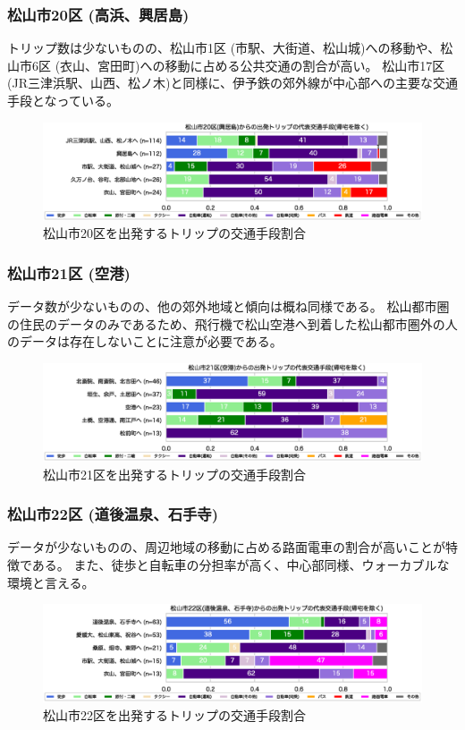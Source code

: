 \documentclass[a4paper,12pt, uplatex]{jsbook}
\begin{document}
\subsubsection{松山市20区 (高浜、興居島)}
トリップ数は少ないものの、松山市1区 (市駅、大街道、松山城)への移動や、松山市6区 (衣山、宮田町)への移動に占める公共交通の割合が高い。
松山市17区 (JR三津浜駅、山西、松ノ木)と同様に、伊予鉄の郊外線が中心部への主要な交通手段となっている。
%
\begin{figure}[H]
    \centering
    \includegraphics[width=1.0\textwidth]{picture/mode_share_松山市20区.eps}
    \caption{松山市20区を出発するトリップの交通手段割合}
    \label{fig:mode_share_20}
\end{figure}

\subsubsection{松山市21区 (空港)}
データ数が少ないものの、他の郊外地域と傾向は概ね同様である。
松山都市圏の住民のデータのみであるため、飛行機で松山空港へ到着した松山都市圏外の人のデータは存在しないことに注意が必要である。
%
\begin{figure}[H]
    \centering
    \includegraphics[width=1.0\textwidth]{picture/mode_share_松山市21区.eps}
    \caption{松山市21区を出発するトリップの交通手段割合}
    \label{fig:mode_share_21}
\end{figure}

\subsubsection{松山市22区 (道後温泉、石手寺)}
データが少ないものの、周辺地域の移動に占める路面電車の割合が高いことが特徴である。
また、徒歩と自転車の分担率が高く、中心部同様、ウォーカブルな環境と言える。
%
\begin{figure}[H]
    \centering
    \includegraphics[width=1.0\textwidth]{picture/mode_share_松山市22区.eps}
    \caption{松山市22区を出発するトリップの交通手段割合}
    \label{fig:mode_share_22}
\end{figure}
\end{document}

